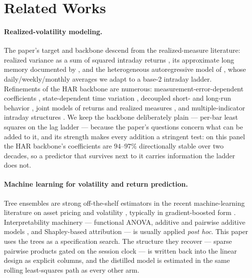 \section{Related Works}
\label{sec:related}


\paragraph{Realized-volatility modeling.}
The paper's target and backbone descend from the realized-measure
literature: realized variance as a sum of squared intraday returns
\citep{AndersenBollerslev1997,BarndorffNielsenShephard2004}, its
approximate long memory documented by
\citet{AndersenBollerslevDieboldLabys2003}, and the heterogeneous
autoregressive model of \citet{Corsi2009}, whose daily/weekly/monthly
averages we adapt to a base-2 intraday ladder. Refinements of the HAR
backbone are numerous: measurement-error-dependent coefficients
\citep{BollerslevPattonQuaedvlieg2016}, state-dependent time variation
\citep{BekiermanManner2018}, decoupled short- and long-run behavior
\citep{BennedsenLundePakkanen2022}, joint models of returns and realized
measures \citep{HansenHuangShek2012}, and multiple-indicator intraday
structures \citep{EngleGallo2006}. We keep the backbone deliberately
plain --- per-bar least squares on the lag ladder --- because the paper's
questions concern what can be added to it, and its strength makes every
addition a stringent test: on this panel the HAR backbone's coefficients are
$94$--$97\%$ directionally stable over two decades, so a predictor that
survives next to it carries information the ladder does not.

\paragraph{Machine learning for volatility and return prediction.}
Tree ensembles are strong off-the-shelf estimators in the recent
machine-learning literature on asset pricing and volatility
\citep{gu2020empirical,christensen2023machine}, typically in
gradient-boosted form \citep{Ke2017,Chen2016}. Interpretability
machinery --- functional ANOVA, additive and pairwise additive models
\citep{Lou2013}, and Shapley-based attribution
\citep{lundberg2017unified,lundberg2018consistent} --- is usually
applied \emph{post hoc}. This paper uses the trees as a specification
search. The structure they recover --- sparse pairwise products gated
on the session clock --- is written back into the linear design as
explicit columns, and the distilled model is estimated in the same
rolling least-squares path as every other arm.

